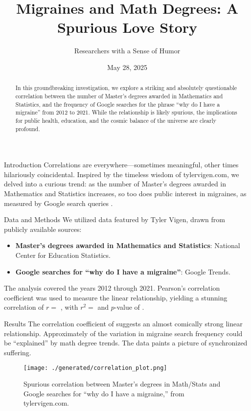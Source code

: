\documentclass{article}
\title{\textbf{Migraines and Math Degrees: A Spurious Love Story}}
\author{Researchers with a Sense of Humor}
\date{May 28, 2025}
\begin{document}
\maketitle

\begin{abstract}
  In this groundbreaking investigation, we explore a striking and absolutely questionable correlation between the number of Master's degrees awarded in Mathematics and Statistics, and the frequency of Google searches for the phrase ``why do I have a migraine'' from 2012 to 2021. While the relationship is likely spurious, the implications for public health, education, and the cosmic balance of the universe are clearly profound.
\end{abstract}

\begin{section}{Introduction}
 Correlations are everywhere---sometimes meaningful, other times hilariously coincidental. Inspired by the timeless wisdom of tylervigen.com, we delved into a curious trend: as the number of Master's degrees awarded in Mathematics and Statistics increases, so too does public interest in migraines, as measured by Google search queries \cite{vigen}.
\end{section}

\begin{section}{Data and Methods}
 We utilized data featured by Tyler Vigen, drawn from publicly available sources:
 \begin{itemize}
   \item \textbf{Master's degrees awarded in Mathematics and Statistics}: National Center for Education Statistics. \cite{nc_es}
   \item \textbf{Google searches for ``why do I have a migraine''}: Google Trends. \cite{google_trends}
 \end{itemize}
 The analysis covered the years 2012 through 2021. Pearson's correlation coefficient was used to measure the linear relationship, yielding a stunning correlation of $r =$ , with $r^2 =$  and $p$-value of .
\end{section}

\begin{section}{Results}
 The correlation coefficient of  suggests an almost comically strong linear relationship. Approximately  of the variation in migraine search frequency could be ``explained'' by math degree trends. The data paints a picture of synchronized suffering.

 \begin{figure}[H]
   \centering
   \texttt{[image: ./generated/correlation\_plot.png]}
   \caption{Spurious correlation between Master's degrees in Math/Stats and Google searches for ``why do I have a migraine,'' from tylervigen.com.\cite{vigen}}
   \label{fig:correlation}
 \end{figure}

\end{section}
\end{document}
